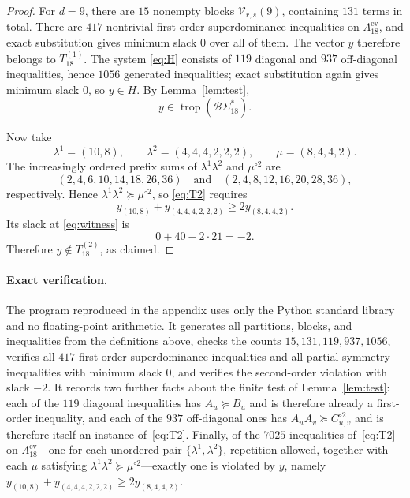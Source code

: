 \documentclass[11pt]{amsart}
\DeclareMathOperator{\trop}{trop}
\newcommand{\BS}{\mathcal{B}\Sigma}
\newcommand{\EPart}{\Lambda^{\mathrm{ev}}}
\begin{document}
\begin{proof}
For \(d=9\), there are \(15\) nonempty blocks
\(\mathcal V_{r,s}(9)\), containing \(131\) terms in total.
There are \(417\) nontrivial first-order superdominance
inequalities on \(\EPart_{18}\), and exact substitution gives minimum
slack \(0\) over all of them. The vector \(y\) therefore belongs to
\(T_{18}^{(1)}\). The system \eqref{eq:H} consists of \(119\) diagonal
and \(937\) off-diagonal inequalities, hence \(1056\) generated
inequalities; exact substitution again gives minimum slack \(0\), so
\(y\in H\). By Lemma~\ref{lem:test},
\[
y\in\trop(\BS_{18}^{*}).
\]

Now take
\[
\lambda^1=(10,8),
\qquad
\lambda^2=(4,4,4,2,2,2),
\qquad
\mu=(8,4,4,2).
\]
The increasingly ordered prefix sums of
\(\lambda^1\lambda^2\) and \(\mu^{\circ2}\) are
\[
(2,4,6,10,14,18,26,36)
\quad\text{and}\quad
(2,4,8,12,16,20,28,36),
\]
respectively. Hence
\(
\lambda^1\lambda^2\succeq\mu^{\circ2}
\), so \eqref{eq:T2} requires
\[
y_{(10,8)}+y_{(4,4,4,2,2,2)}
\ge2y_{(8,4,4,2)}.
\]
Its slack at \eqref{eq:witness} is
\[
0+40-2\cdot21=-2.
\]
Therefore \(y\notin T_{18}^{(2)}\), as claimed.
\end{proof}

\paragraph{Exact verification.}
The program reproduced in the appendix uses
only the Python standard library and no floating-point arithmetic. It
generates all partitions, blocks,
and inequalities from the definitions above, checks the counts
\(15,131,119,937,1056\), verifies all \(417\) first-order
superdominance inequalities and all partial-symmetry inequalities with
minimum slack \(0\), and verifies the second-order violation with
slack \(-2\).
It records two further facts about the finite test of
Lemma~\ref{lem:test}: each of the \(119\) diagonal inequalities has
\(A_u\succeq B_u\) and is therefore already a first-order inequality,
and each of the \(937\) off-diagonal ones has
\(A_uA_v\succeq C_{u,v}^{\circ2}\) and is therefore itself an instance
of~\eqref{eq:T2}. Finally, of the \(7025\) inequalities
of~\eqref{eq:T2} on \(\EPart_{18}\)---one for each unordered pair
\(\{\lambda^1,\lambda^2\}\), repetition allowed, together with each
\(\mu\) satisfying \(\lambda^1\lambda^2\succeq\mu^{\circ2}\)---exactly
one is violated by \(y\), namely
\(y_{(10,8)}+y_{(4,4,4,2,2,2)}\ge2y_{(8,4,4,2)}\).

\raggedbottom
\end{document}
